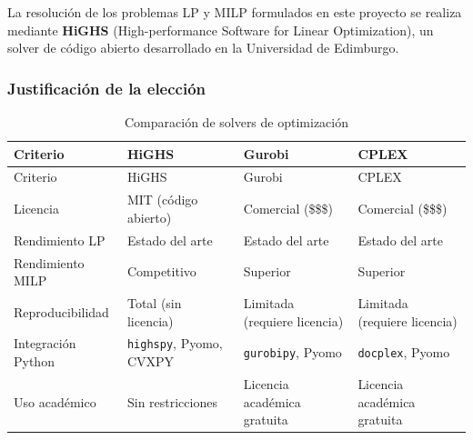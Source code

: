 \documentclass[
  spanish,
  11pt,
  letterpaper,
]{scrbook}
\theoremstyle{plain}
\theoremstyle{remark}
\begin{document}
La resolución de los problemas LP y MILP formulados en este proyecto se
realiza mediante \textbf{HiGHS} (High-performance Software for Linear
Optimization), un solver de código abierto desarrollado en la
Universidad de Edimburgo.

\subsubsection{Justificación de la
elección}\label{justificaciuxf3n-de-la-elecciuxf3n}

\begin{longtable}[]{@{}
  >{\raggedright\arraybackslash}p{}
  >{\raggedright\arraybackslash}p{}
  >{\raggedright\arraybackslash}p{}
  >{\raggedright\arraybackslash}p{}@{}}
\caption{Comparación de solvers de
optimización}\label{tbl-solver-comparison}\tabularnewline
\toprule\noalign{}
\begin{minipage}[b]{\linewidth}\raggedright
Criterio
\end{minipage} & \begin{minipage}[b]{\linewidth}\raggedright
HiGHS
\end{minipage} & \begin{minipage}[b]{\linewidth}\raggedright
Gurobi
\end{minipage} & \begin{minipage}[b]{\linewidth}\raggedright
CPLEX
\end{minipage} \\
\midrule\noalign{}
\endfirsthead
\toprule\noalign{}
\begin{minipage}[b]{\linewidth}\raggedright
Criterio
\end{minipage} & \begin{minipage}[b]{\linewidth}\raggedright
HiGHS
\end{minipage} & \begin{minipage}[b]{\linewidth}\raggedright
Gurobi
\end{minipage} & \begin{minipage}[b]{\linewidth}\raggedright
CPLEX
\end{minipage} \\
\midrule\noalign{}
\endhead
\bottomrule\noalign{}
\endlastfoot
Licencia & MIT (código abierto) & Comercial (\$\$\$) & Comercial
(\$\$\$) \\
Rendimiento LP & Estado del arte & Estado del arte & Estado del arte \\
Rendimiento MILP & Competitivo & Superior & Superior \\
Reproducibilidad & Total (sin licencia) & Limitada (requiere licencia) &
Limitada (requiere licencia) \\
Integración Python & \texttt{highspy}, Pyomo, CVXPY & \texttt{gurobipy},
Pyomo & \texttt{docplex}, Pyomo \\
Uso académico & Sin restricciones & Licencia académica gratuita &
Licencia académica gratuita \\
\end{longtable}
\end{document}
